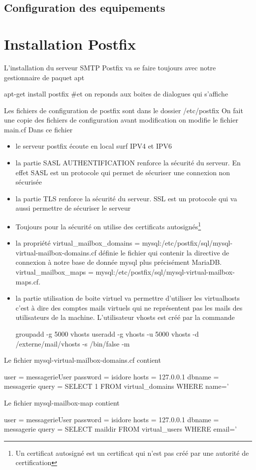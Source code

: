 \documentclass[a4paper,12pt,french]{report} %
\begin{document}
\subsection{Configuration des equipements}

\section{Installation Postfix}
L'installation du serveur SMTP Postfix va se faire toujours avec notre gestionnaire de paquet apt
\begin{exempleConsole}
apt-get install postfix #et on reponds aux boites de dialogues qui s'affiche
\end{exempleConsole}

Les fichiers de configuration de postfix sont dans le dossier /etc/postfix
On fait une copie des fichiers de configuration avant modification
on modifie le fichier main.cf
Dans ce fichier 
\begin{itemize}
	\item le serveur postfix écoute en local surf IPV4 et IPV6
	\item la partie SASL AUTHENTIFICATION renforce la sécurité du serveur. En effet SASL est un protocole qui permet de sécuriser une connexion non sécurisée
	\item la partie TLS renforce la sécurité du serveur. SSL est un protocole qui va aussi permettre de sécuriser le serveur
	\item Toujours pour la sécurité on utilise des certificats autosignés\footnote{Un certificat autosigné est un certificat qui n'est pas créé par une autorité de certification} 
	\item la propriété virtual\_mailbox\_domains = mysql:/etc/postfix/sql/mysql-virtual-mailbox-domains.cf définie le fichier qui contenir la directive de connexion à notre base de donnée mysql plus précisément MariaDB. virtual\_mailbox\_maps = mysql:/etc/postfix/sql/mysql-virtual-mailbox-maps.cf.	
	\item la partie utilisation de boite virtuel va permettre d'utiliser les virtualhosts c'est à dire des comptes mails virtuels qui ne représentent pas les mails des utilisateurs de la machine. L'utilisateur vhosts est créé par la commande
	\begin{exempleConsole}
	groupadd -g 5000 vhosts 
	useradd -g vhosts -u 5000 vhosts -d /externe/mail/vhosts -s /bin/false -m
	\end{exempleConsole}
\end{itemize}
Le fichier mysql-virtual-mailbox-domains.cf contient 
\begin{exempleConsole}
user = messagerieUser
password = isidore
hosts = 127.0.0.1
dbname = messagerie
query = SELECT 1 FROM virtual_domains WHERE name='%
\end{exempleConsole}
Le fichier mysql-mailbox-map contient 
\begin{exempleConsole}
user = messagerieUser
password = isidore
hosts = 127.0.0.1
dbname = messagerie
query = SELECT maildir FROM virtual_users WHERE email='%
\end{exempleConsole}
\end{document}
